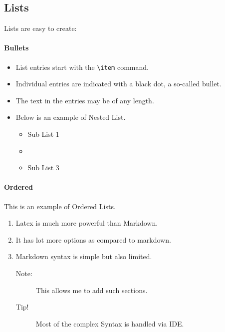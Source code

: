 \documentclass{article}[a4paper,12pt]
\begin{document}
\subsection{Lists}
Lists are easy to create:
\paragraph{Bullets}

\begin{itemize}
  \label{lst:bullet}
  \item List entries start with the \verb|\item| command.
  \item Individual entries are indicated with a black dot, a so-called bullet.
  \item The text in the entries may be of any length.
  \item Below is an example of Nested List.
  \begin{itemize}
    \item Sub List 1
    \item \lipsum[1]
    \item Sub List 3
  \end{itemize}
\end{itemize}

\paragraph{Ordered}
This is an example of Ordered Lists.

\begin{enumerate}
  \label{lst:order}
  \item Latex is much more powerful than Markdown.
  \item It has lot more options as compared to markdown.
  \item Markdown syntax is simple but also limited.
  \begin{description}
    \item[Note:] This allows me to add such sections.
    \item[Tip!] Most of the complex Syntax is handled via IDE.
  \end{description}
\end{enumerate}

\begin{appendix}
  \listoffigures
  \listoftables
\end{appendix}
\end{document}
